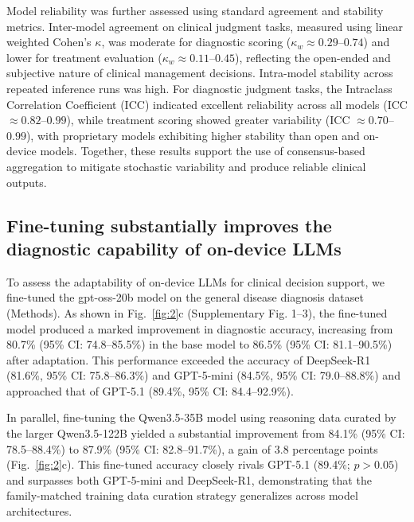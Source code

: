 \documentclass[10pt,journal,compsoc, onecolumn]{IEEEtran}
\begin{document}
Model reliability was further assessed using standard agreement and stability metrics.
Inter-model agreement on clinical judgment tasks, measured using linear weighted Cohen’s $\kappa$, was moderate for diagnostic scoring ($\kappa_w \approx 0.29$--$0.74$) and lower for treatment evaluation ($\kappa_w \approx 0.11$--$0.45$), reflecting the open-ended and subjective nature of clinical management decisions.
Intra-model stability across repeated inference runs was high. For diagnostic judgment tasks, the Intraclass Correlation Coefficient (ICC) indicated excellent reliability across all models (ICC $\approx 0.82$--$0.99$), while treatment scoring showed greater variability (ICC $\approx 0.70$--$0.99$), with proprietary models exhibiting higher stability than open and on-device models.
Together, these results support the use of consensus-based aggregation to mitigate stochastic variability and produce reliable clinical outputs.




\subsection*{Fine-tuning substantially improves the diagnostic capability of on-device LLMs}
To assess the adaptability of on-device LLMs for clinical decision support, we fine-tuned the gpt-oss-20b model on the general disease diagnosis dataset (Methods). As shown in Fig.~\ref{fig:2}c (Supplementary Fig. 1--3), the fine-tuned model produced a marked improvement in diagnostic accuracy, increasing from 80.7\% (95\% CI: 74.8--85.5\%) in the base model to 86.5\% (95\% CI: 81.1--90.5\%) after adaptation. This performance exceeded the accuracy of DeepSeek-R1 (81.6\%, 95\% CI: 75.8--86.3\%) and GPT-5-mini (84.5\%, 95\% CI: 79.0--88.8\%) and approached that of GPT-5.1 (89.4\%, 95\% CI: 84.4--92.9\%).

In parallel, fine-tuning the Qwen3.5-35B model using reasoning data curated by the larger Qwen3.5-122B yielded a substantial improvement from 84.1\% (95\% CI: 78.5--88.4\%) to 87.9\% (95\% CI: 82.8--91.7\%), a gain of 3.8 percentage points (Fig.~\ref{fig:2}c). This fine-tuned accuracy closely rivals GPT-5.1 (89.4\%; $p>0.05$) and surpasses both GPT-5-mini and DeepSeek-R1, demonstrating that the family-matched training data curation strategy generalizes across model architectures.
\end{document}
